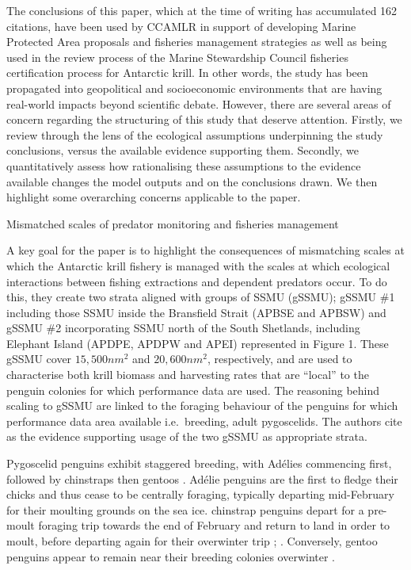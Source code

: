 \documentclass[]{elsarticle} %
\begin{document}
The conclusions of this paper, which at the time of writing has
accumulated 162 citations, have been used by CCAMLR in support of
developing Marine Protected Area proposals and fisheries management
strategies as well as being used in the review process of the Marine
Stewardship Council fisheries certification process for Antarctic krill.
In other words, the study has been propagated into geopolitical and
socioeconomic environments that are having real-world impacts beyond
scientific debate. However, there are several areas of concern regarding
the structuring of this study that deserve attention. Firstly, we review
\citet{Watters2020} through the lens of the ecological assumptions
underpinning the study conclusions, versus the available evidence
supporting them. Secondly, we quantitatively assess how rationalising
these assumptions to the evidence available changes the model outputs
and on the conclusions drawn. We then highlight some overarching
concerns applicable to the paper.

Mismatched scales of predator monitoring and fisheries management

A key goal for the paper is to highlight the consequences of mismatching
scales at which the Antarctic krill fishery is managed with the scales
at which ecological interactions between fishing extractions and
dependent predators occur. To do this, they create two strata aligned
with groups of SSMU (gSSMU); gSSMU \#1 including those SSMU inside the
Bransfield Strait (APBSE and APBSW) and gSSMU \#2 incorporating SSMU
north of the South Shetlands, including Elephant Island (APDPE, APDPW
and APEI) represented in Figure 1. These gSSMU cover \(15,500nm^2\) and
\(20,600nm^2\), respectively, and are used to characterise both krill
biomass and harvesting rates that are ``local'' to the penguin colonies
for which performance data are used. The reasoning behind scaling to
gSSMU are linked to the foraging behaviour of the penguins for which
performance data area available i.e.~breeding, adult pygoscelids. The
authors cite \citet{Hinke2017} as the evidence supporting usage of the
two gSSMU as appropriate strata.

Pygoscelid penguins exhibit staggered breeding, with Adélies commencing
first, followed by chinstraps then gentoos \citep{Black2016}. Adélie
penguins are the first to fledge their chicks and thus cease to be
centrally foraging, typically departing mid-February for their moulting
grounds on the sea ice. chinstrap penguins depart for a pre-moult
foraging trip towards the end of February and return to land in order to
moult, before departing again for their overwinter trip
\citet{Hinke2015}; \citet{Hinke2019}. Conversely, gentoo penguins appear
to remain near their breeding colonies overwinter
\citep{korczak-abshireCoastalRegionsNorthern2021}.
\end{document}

